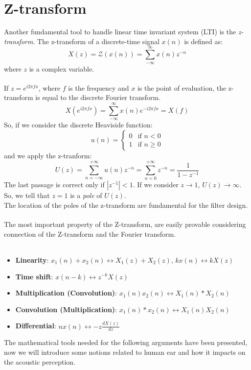 \section{Z-transform}
Another fundamental tool to handle linear time invariant system (LTI) is the \textit{z-transform}. The z-transform of a discrete-time signal $x(n)$ is defined as:
\begin{equation}
 X(z) = \mathcal{Z}(x(n)) = \sum_{-\infty}^\infty x(n) z^{-n}
\end{equation}
where $z$ is a complex variable.\\\\
If $z = e^{i 2\pi f x}$, where $f$ is the frequency and $x$ is the point of evaluation, the z-transform is equal to the discrete Fourier transform.
\[ X(e^{i2\pi f x}) =  \sum_{-\infty}^\infty x(n) e^{-i2\pi f x} = X(f)\]
So, if we consider the discrete Heaviside function:
\[ u(n) = \begin{cases} 0 &\mbox{if } n < 0 \\ 
1 & \mbox{if } n \geq 0 \end{cases}  \]
and we apply the z-tranform:
\[ U(z) = \sum_{n=-\infty}^{+\infty} u(n)z^{-n} = \sum_{n=0}^{+\infty} z^{-n} = \frac{1}{1-z^{-1}} \]
The last passage is correct only if $|z^{-1}|<1$. If we consider $z \rightarrow 1$, $U(z) \rightarrow \infty$. So, we tell that $z=1$ is a \textit{pole} of $U(z)$.\\
The location of the poles of the z-transform are fundamental for the filter design.\\\\
The most important property of the Z-transform, are easily provable considering connection of the Z-transform and the Fourier transform.\\\\
\begin{itemize}
\item \textbf{Linearity}: $x_1(n) + x_2(n) \longleftrightarrow X_1(z) + X_2(z)$, $kx(n) \longleftrightarrow kX(z)$
\item \textbf{Time shift}: $x(n-k) \longleftrightarrow z^{-k}X(z)$
\item \textbf{Multiplication (Convolution)}: $x_1(n)x_2(n) \longleftrightarrow X_1(n)*X_2(n)$
\item \textbf{Convolution (Multiplication)}: $x_1(n)*x_2(n) \longleftrightarrow X_1(n)X_2(n)$
\item \textbf{Differential}: $nx(n) \longleftrightarrow -z\frac{dX(z)}{dz}$
\end{itemize}
The mathematical tools needed for the following arguments have been presented, now we will introduce some notions related to human ear and how it impacts on the acoustic perception.
